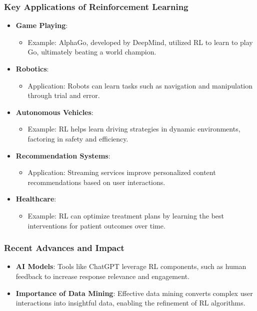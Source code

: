 \documentclass[aspectratio=169]{beamer}
\begin{document}
\begin{frame}[fragile]
    \frametitle{Key Applications of Reinforcement Learning}
    \begin{itemize}
        \item \textbf{Game Playing}:
        \begin{itemize}
            \item Example: AlphaGo, developed by DeepMind, utilized RL to learn to play Go, ultimately beating a world champion.
        \end{itemize}
        
        \item \textbf{Robotics}:
        \begin{itemize}
            \item Application: Robots can learn tasks such as navigation and manipulation through trial and error.
        \end{itemize}
        
        \item \textbf{Autonomous Vehicles}:
        \begin{itemize}
            \item Example: RL helps learn driving strategies in dynamic environments, factoring in safety and efficiency.
        \end{itemize}
        
        \item \textbf{Recommendation Systems}:
        \begin{itemize}
            \item Application: Streaming services improve personalized content recommendations based on user interactions.
        \end{itemize}
        
        \item \textbf{Healthcare}:
        \begin{itemize}
            \item Example: RL can optimize treatment plans by learning the best interventions for patient outcomes over time.
        \end{itemize}
    \end{itemize}
\end{frame}

\begin{frame}[fragile]
    \frametitle{Recent Advances and Impact}
    \begin{itemize}
        \item \textbf{AI Models}: Tools like ChatGPT leverage RL components, such as human feedback to increase response relevance and engagement.
        
        \item \textbf{Importance of Data Mining}: Effective data mining converts complex user interactions into insightful data, enabling the refinement of RL algorithms.
    \end{itemize}
\end{frame}
\end{document}
